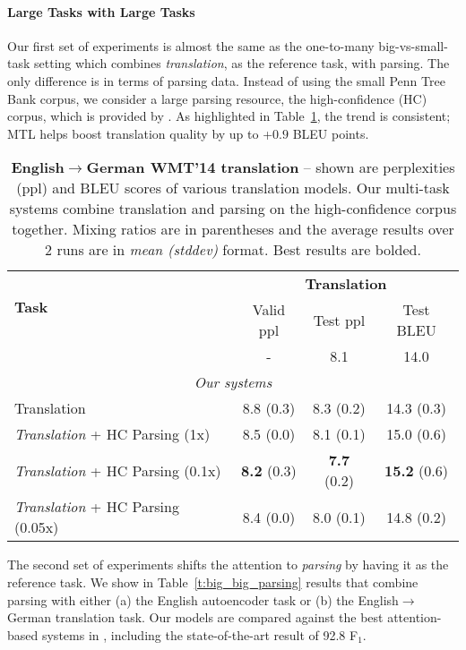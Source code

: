 \paragraph{Large Tasks with Large Tasks}
\label{subsub:ll}
Our first set of experiments is almost the same as the one-to-many
big-vs-small-task setting
which combines {\it translation}, as the reference
task, with parsing. The only difference is in terms of parsing data. Instead of using the
small Penn Tree Bank corpus, we consider a large parsing resource, the
high-confidence (HC) corpus, which is provided by \citet{vinyals15grammar}.
As highlighted in Table~\ref{t:big_big_translation}, the
trend is consistent; MTL helps boost translation quality by up
to +$0.9$ BLEU points. 

\begin{table}[tbh!]
\centering
\begin{tabular}{l|c|c|c}
\multirow{ 2}{*}{\bf{Task}} & \multicolumn{3}{c}{{\bf Translation}}\\
  \cline{2-4}
  & Valid ppl & Test ppl & Test BLEU\\
  \hline
\citep{luong15attn} & - & 8.1 & 14.0 \\
  \hline
\multicolumn{4}{c}{{\it Our systems}} \\
  \hline
Translation & 8.8 (0.3) & 8.3 (0.2) & 14.3 (0.3)\\
  \hline
{\it Translation} + HC Parsing (1x) &  8.5 (0.0) & 8.1 (0.1) & 15.0 (0.6) \\
{\it Translation} + HC Parsing (0.1x) &  {\bf 8.2} (0.3) & {\bf 7.7} (0.2) &
{\bf 15.2} (0.6)\\
{\it Translation} + HC Parsing (0.05x) &  8.4 (0.0) & 8.0 (0.1) & 14.8 (0.2) \\
\end{tabular}
\caption{{\bf English$\rightarrow$German WMT'14 translation} -- shown are
perplexities (ppl) and BLEU scores of various translation models. Our
multi-task systems combine translation and parsing on the
high-confidence corpus together. Mixing
ratios are in parentheses and the average results over 2 runs are in {\it
mean (stddev)} format. Best results are bolded.}
\label{t:big_big_translation}
\end{table}

The second set of experiments shifts the attention to {\it parsing} by having it as the reference task. 
We show in Table~\ref{t:big_big_parsing} results that combine parsing with
either (a) the English autoencoder task or (b) the English$\rightarrow$German
translation task. Our models are compared against the best attention-based systems in
\citep{vinyals15grammar}, including the state-of-the-art result of 92.8 F$_1$.

